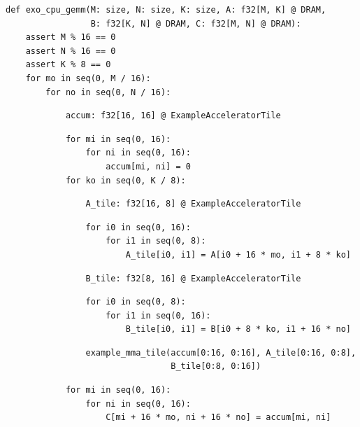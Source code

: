 \begin{minipage}[t]{0.5\textwidth}\codeminipage
\tiny
\begin{verbatim}
def exo_cpu_gemm(M: size, N: size, K: size, A: f32[M, K] @ DRAM,
                 B: f32[K, N] @ DRAM, C: f32[M, N] @ DRAM):
    assert M % 16 == 0
    assert N % 16 == 0
    assert K % 8 == 0
    for mo in seq(0, M / 16):
        for no in seq(0, N / 16):
\end{verbatim}
\begin{mdframed}[style=MyFrame, backgroundcolor=violetBoxBg]
\color{violetBoxFg}
\begin{verbatim}
            accum: f32[16, 16] @ ExampleAcceleratorTile
\end{verbatim}
\end{mdframed}
\begin{verbatim}
            for mi in seq(0, 16):
                for ni in seq(0, 16):
                    accum[mi, ni] = 0
            for ko in seq(0, K / 8):
\end{verbatim}
\begin{mdframed}[style=MyFrame, backgroundcolor=yellowBoxBg]
\color{yellowBoxFg}
\begin{verbatim}
                A_tile: f32[16, 8] @ ExampleAcceleratorTile
\end{verbatim}
\end{mdframed}
\begin{verbatim}
                for i0 in seq(0, 16):
                    for i1 in seq(0, 8):
                        A_tile[i0, i1] = A[i0 + 16 * mo, i1 + 8 * ko]
\end{verbatim}
\begin{mdframed}[style=MyFrame, backgroundcolor=greenBoxBg]
\color{greenBoxFg}
\begin{verbatim}
                B_tile: f32[8, 16] @ ExampleAcceleratorTile
\end{verbatim}
\end{mdframed}
\begin{verbatim}
                for i0 in seq(0, 8):
                    for i1 in seq(0, 16):
                        B_tile[i0, i1] = B[i0 + 8 * ko, i1 + 16 * no]
\end{verbatim}
\begin{mdframed}[style=MyFrame, backgroundcolor=blueBoxBg]
\color{blueBoxFg}
\begin{verbatim}
                example_mma_tile(accum[0:16, 0:16], A_tile[0:16, 0:8],
                                 B_tile[0:8, 0:16])
\end{verbatim}
\end{mdframed}
\begin{verbatim}
            for mi in seq(0, 16):
                for ni in seq(0, 16):
                    C[mi + 16 * mo, ni + 16 * no] = accum[mi, ni]
\end{verbatim}
\end{minipage}
